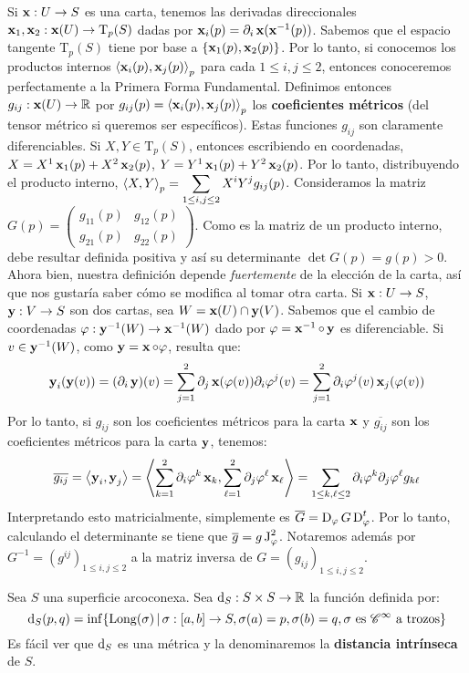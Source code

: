 Si $\operatorname{\mathbf{x}}:U\to S$ es una carta, tenemos las derivadas direccionales $\operatorname{\mathbf{x}}_1,\operatorname{\mathbf{x}}_2:\operatorname{\mathbf{x}}(U)\to\mathrm{T}_p(S)$ dadas por $\operatorname{\mathbf{x}}_i(p)=\partial_i\operatorname{\mathbf{x}}(\operatorname{\mathbf{x}}^{-1}(p))$. Sabemos que el espacio tangente $\mathrm{T}_p(S)$ tiene por base a $\{\operatorname{\mathbf{x}}_1(p),\operatorname{\mathbf{x}}_2(p)\}$. Por lo tanto, si conocemos los productos internos $\left\langle \operatorname{\mathbf{x}}_i(p),\operatorname{\mathbf{x}}_j(p) \right\rangle_p$ para cada $1\leq i,j\leq 2$, entonces conoceremos perfectamente a la Primera Forma Fundamental. Definimos entonces $g_{ij}:\operatorname{\mathbf{x}}(U)\to\mathbb{R}$ por $g_{ij}(p)=\left\langle \operatorname{\mathbf{x}}_i(p),\operatorname{\mathbf{x}}_j(p) \right\rangle_p$ los \textbf{coeficientes métricos} (del tensor métrico si queremos ser específicos). Estas funciones $g_{ij}$ son claramente diferenciables. Si $X,Y\in\mathrm{T}_p(S)$, entonces escribiendo en coordenadas, $X=X^1\operatorname{\mathbf{x}}_1(p)+X^2\operatorname{\mathbf{x}}_2(p)$, $Y=Y^1\operatorname{\mathbf{x}}_1(p)+Y^2\operatorname{\mathbf{x}}_2(p)$. Por lo tanto, distribuyendo el producto interno, $\left\langle X,Y \right\rangle_p = \displaystyle\sum_{1\leq i,j\leq 2}X^iY^j g_{ij}(p)$. Consideramos la matriz $G(p) = \begin{pmatrix}g_{11}(p)& g_{12}(p)\\ g_{21}(p)& g_{22}(p)\end{pmatrix}$. Como es la matriz de un producto interno, debe resultar definida positiva y así su determinante $\det G(p) = g(p)>0$. Ahora bien, nuestra definición depende \textit{fuertemente} de la elección de la carta, así que nos gustaría saber cómo se modifica al tomar otra carta. Si $\operatorname{\mathbf{x}}:U\to S$, $\operatorname{\mathbf{y}}:V\to S$ son dos cartas, sea $W=\operatorname{\mathbf{x}}(U)\cap\operatorname{\mathbf{y}}(V)$. Sabemos que el cambio de coordenadas $\varphi:\operatorname{\mathbf{y}}^{-1}(W)\to\operatorname{\mathbf{x}}^{-1}(W)$ dado por $\varphi = \operatorname{\mathbf{x}}^{-1}\circ\operatorname{\mathbf{y}}$ es diferenciable. Si $v\in\operatorname{\mathbf{y}}^{-1}(W)$, como $\operatorname{\mathbf{y}}=\operatorname{\mathbf{x}}\circ\varphi$, resulta que: $$\operatorname{\mathbf{y}}_i(\operatorname{\mathbf{y}}(v))=(\partial_i\operatorname{\mathbf{y}})(v) = \displaystyle\sum_{j=1}^2\partial_j\operatorname{\mathbf{x}}(\varphi(v))\partial_i\varphi^j(v) = \displaystyle\sum_{j=1}^2 \partial_i\varphi^j(v)\operatorname{\mathbf{x}}_j(\varphi(v))$$
Por lo tanto, si $g_{ij}$ son los coeficientes métricos para la carta $\operatorname{\mathbf{x}}$ y $\overline{g_{ij}}$ son los coeficientes métricos para la carta $\operatorname{\mathbf{y}}$, tenemos: $$\overline{g_{ij}} =\left\langle \operatorname{\mathbf{y}}_i,\operatorname{\mathbf{y}}_j \right\rangle = \left\langle  \displaystyle\sum_{k=1}^2 \partial_i\varphi^k \operatorname{\mathbf{x}}_k , \displaystyle\sum_{\ell=1}^2 \partial_j\varphi^\ell \operatorname{\mathbf{x}}_\ell \right\rangle = \displaystyle\sum_{1\leq k,\ell\leq 2} \partial_i\varphi^k\partial_j\varphi^\ell g_{k\ell}$$ Interpretando esto matricialmente, simplemente es $\overline{G} = \operatorname{\mathrm{D}}_\varphi G\operatorname{\mathrm{D}}_{\varphi}^t$. Por lo tanto, calculando el determinante se tiene que $\overline{g} = g \operatorname{\mathrm{J}}_\varphi^2$. Notaremos además por $G^{-1}=(g^{ij})_{1\leq i,j\leq 2}$ a la matriz inversa de $G=(g_{ij})_{1\leq i,j\leq 2}$.

\begin{defn}
Sea $S$ una superficie arcoconexa. Sea $\mathop{}\!\mathrm{d}_S:S\times S\to\mathbb{R}$ la función definida por: $$\mathop{}\!\mathrm{d}_S(p,q) = \inf\{\mathrm{Long}(\sigma) \,|\, \sigma:[a,b]\to S, \sigma(a)=p, \sigma(b)=q, \sigma \text{ es }\mathscr{C}^\infty \text{ a trozos}\} $$ Es fácil ver que $\mathop{}\!\mathrm{d}_S$ es una métrica y la denominaremos la \textbf{distancia intrínseca} de $S$.
\end{defn}

